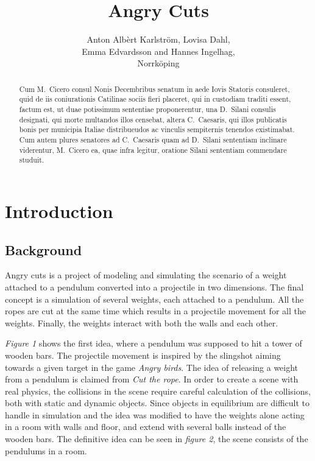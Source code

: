 \documentclass[a4paper,12pt,twoside,english]{article}
\title{Angry Cuts}
\author{Anton Alb\`{e}rt Karlstr\"{o}m, Lovisa Dahl, \\Emma Edvardsson
 and Hannes Ingelhag, \\Norrk\"{o}ping}
\begin{document}


\maketitle
\newpage
\begin{abstract}
Cum M.~Cicero consul Nonis Decembribus senatum in aede
Iovis Statoris consuleret, quid de iis coniurationis Catilinae
sociis fieri placeret, qui in custodiam traditi essent, factum
est, ut duae potissimum sententiae proponerentur, una D.~Silani consulis
designati, qui morte multandos illos censebat,
altera C.~Caesaris, qui illos publicatis bonis per municipia
Italiae distribueudos ac vinculis sempiternis tenendos existimabat. Cum
autem plures senatores ad C.~Caesaris quam ad
D.~Silani sententiam inclinare viderentur, M.~Cicero ea, quae
infra legitur, oratione Silani sententiam commendare studuit.
\vfill
\end{abstract}


\newpage
\pagestyle{plain}


\setcounter{page}{1}
\section{Introduction}
\subsection{Background}
Angry cuts is a project of modeling and simulating the scenario of a weight attached to a pendulum converted into a projectile in two dimensions. 
The final concept is a simulation of several weights, each attached to a pendulum. All the ropes are cut at the same time which results in a projectile movement for all the weights. Finally, the weights interact with both the walls and each other.

\textit{Figure 1} shows the first idea, where a pendulum was supposed to hit a tower of wooden bars. The projectile movement is inspired by the slingshot aiming towards a given target in the game {\itshape Angry birds}. The idea of releasing a weight from a pendulum is claimed from {\itshape Cut the rope}. In order to create a scene with real physics, the collisions in the scene require careful calculation of the collisions, both with static and dynamic objects. Since objects in equilibrium are difficult to handle in simulation and the idea was modified to have the weights alone acting in a room with walls and floor, and extend with several balls instead of the wooden bars. The definitive idea can be seen in \textit{figure 2}, the scene consists of the pendulums in a room.
\end{document}
